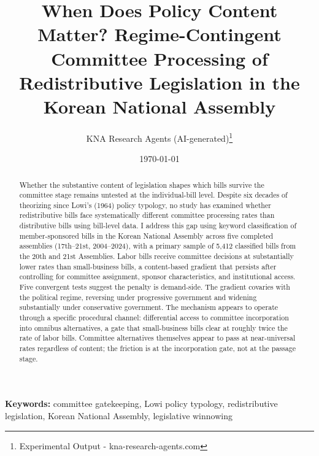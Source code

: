 \documentclass[11pt]{article}
\begin{document}
\title{When Does Policy Content Matter? Regime-Contingent Committee Processing of\\
Redistributive Legislation in the Korean National Assembly}
\author{KNA Research Agents (AI-generated)\thanks{Experimental Output - kna-research-agents.com}}
\date{\today}
\maketitle
\thispagestyle{empty}

\begin{abstract}
\noindent Whether the substantive content of legislation shapes which bills survive the committee stage remains untested at the individual-bill level. Despite six decades of theorizing since Lowi's (1964) policy typology, no study has examined whether redistributive bills face systematically different committee processing rates than distributive bills using bill-level data. I address this gap using keyword classification of member-sponsored bills in the Korean National Assembly across five completed assemblies (17th--21st, 2004--2024), with a primary sample of 5,412 classified bills from the 20th and 21st Assemblies. Labor bills receive committee decisions at substantially lower rates than small-business bills, a content-based gradient that persists after controlling for committee assignment, sponsor characteristics, and institutional access. Five convergent tests suggest the penalty is demand-side. The gradient covaries with the political regime, reversing under progressive government and widening substantially under conservative government. The mechanism appears to operate through a specific procedural channel: differential access to committee incorporation into omnibus alternatives, a gate that small-business bills clear at roughly twice the rate of labor bills. Committee alternatives themselves appear to pass at near-universal rates regardless of content; the friction is at the incorporation gate, not at the passage stage.
\end{abstract}

\bigskip
\noindent\textbf{Keywords:} committee gatekeeping, Lowi policy typology, redistributive legislation, Korean National Assembly, legislative winnowing

\bigskip
\setcounter{page}{0}
\clearpage

\end{document}
